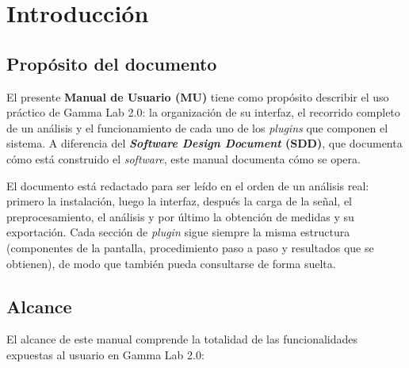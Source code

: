 \documentclass[11pt,a4paper]{article}
\begin{document}
\tableofcontents
\newpage

\listoffigures
\newpage

\listoftables
\newpage

\section{Introducci\'on}

    \subsection{Prop\'osito del documento}
    El presente \textbf{Manual de Usuario (MU)} tiene como prop\'osito describir el uso pr\'actico de Gamma Lab 2.0: la organizaci\'on de su interfaz, el recorrido completo de un an\'alisis y el funcionamiento de cada uno de los \textit{plugins} que componen el sistema. A diferencia del \textbf{\textit{Software Design Document} (SDD)}, que documenta c\'omo est\'a construido el \textit{software}, este manual documenta c\'omo se opera.

    El documento est\'a redactado para ser le\'ido en el orden de un an\'alisis real: primero la instalaci\'on, luego la interfaz, despu\'es la carga de la se\~nal, el preprocesamiento, el an\'alisis y por \'ultimo la obtenci\'on de medidas y su exportaci\'on. Cada secci\'on de \textit{plugin} sigue siempre la misma estructura (componentes de la pantalla, procedimiento paso a paso y resultados que se obtienen), de modo que tambi\'en pueda consultarse de forma suelta.

    \subsection{Alcance}
    El alcance de este manual comprende la totalidad de las funcionalidades expuestas al usuario en Gamma Lab 2.0:
\end{document}
